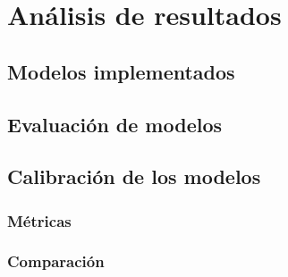\chapter{Análisis de resultados} 

\section{Modelos implementados}

\section{Evaluación de modelos}

\section{Calibración de los modelos}
\subsection{Métricas}
\subsection{Comparación}